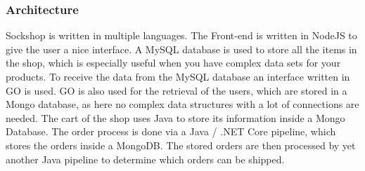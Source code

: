 \subsubsection{Architecture}
Sockshop is written in multiple languages. The Front-end is written in NodeJS to give the user a nice interface. A MySQL database is used to store all the items in the shop, which is especially useful when you have complex data sets for your products. To receive the data from the MySQL database an interface written in GO is used. 
GO is also used for the retrieval of the users, which are stored in a Mongo database, as here no complex data structures with a lot of connections are needed.
The cart of the shop uses Java to store its information inside a Mongo Database. 
The order process is done via a Java / .NET Core pipeline, which stores the orders inside a MongoDB. The stored orders are then processed by yet another Java pipeline to determine which orders can be shipped.

 


